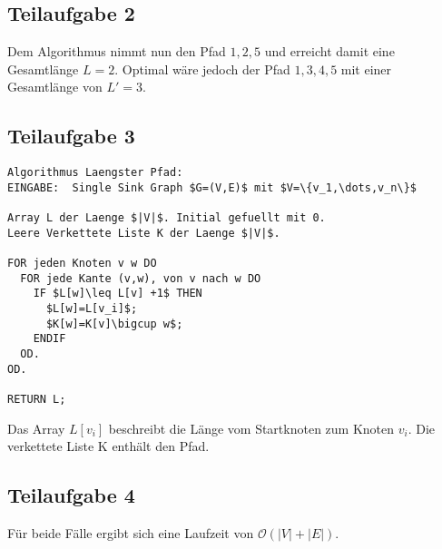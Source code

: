 \documentclass[a4paper, fontsize=10pt]{scrartcl}
\begin{document}
\subsection*{Teilaufgabe 2}

\begin{center}
\end{center}
\bigskip

Dem Algorithmus nimmt nun den Pfad $1,2,5$ und erreicht damit eine Gesamtlänge $L=2$. Optimal wäre jedoch der Pfad $1,3,4,5$ mit einer Gesamtlänge von $L'=3$. \bigskip

\subsection*{Teilaufgabe 3}

\begin{lstlisting}[mathescape]
Algorithmus Laengster Pfad:
EINGABE:  Single Sink Graph $G=(V,E)$ mit $V=\{v_1,\dots,v_n\}$
          
Array L der Laenge $|V|$. Initial gefuellt mit 0.
Leere Verkettete Liste K der Laenge $|V|$.

FOR jeden Knoten v w DO
  FOR jede Kante (v,w), von v nach w DO
    IF $L[w]\leq L[v] +1$ THEN
      $L[w]=L[v_i]$;
      $K[w]=K[v]\bigcup w$;
    ENDIF
  OD.
OD.

RETURN L;

\end{lstlisting}
\bigskip

Das Array $L[v_i]$ beschreibt die Länge vom Startknoten zum Knoten $v_i$. Die verkettete Liste K enthält den Pfad.\bigskip

\subsection*{Teilaufgabe 4}
Für beide Fälle ergibt sich eine Laufzeit von $\mathcal{O}(|V|+|E|)$.
\end{document}
